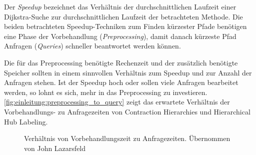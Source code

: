Der \emph{Speedup} bezeichnet das Verhältnis der durchschnittlichen Laufzeit einer Dijkstra-Suche zur durchschnittlichen Laufzeit der betrachteten Methode.
Die beiden betrachteten Speedup-Techniken zum Finden kürzester Pfade benötigen eine Phase der Vorbehandlung (\emph{Preprocessing}), damit danach kürzeste Pfad Anfragen (\emph{Queries}) schneller beantwortet werden können.

Die für das Preprocessing benötigte Rechenzeit und der zusätzlich benötigte Speicher sollten in einem sinnvollen Verhältnis zum Speedup und zur Anzahl der Anfragen stehen.
Ist der Speedup hoch oder sollen viele Anfragen bearbeitet werden, so lohnt es sich, mehr in das Preprocessing zu investieren.
\autoref{fig:einleitung:preprocessing_to_query} zeigt das erwartete Verhältnis der Vorbehandlungs- zu Anfragezeiten von Contraction Hierarchies und Hierarchical Hub Labeling.

\begin{figure}[h!]
  \centering
  \caption{Verhältnis von Vorbehandlungszeit zu Anfragezeiten. Übernommen von John Lazarsfeld\cite{Lazarsfeld}}
  \label{fig:einleitung:preprocessing_to_query}
\end{figure}
